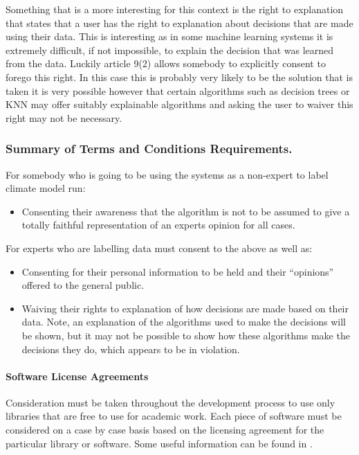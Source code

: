 \documentclass{ecmm427_assignment}
\begin{document}
 Something that is a more interesting for this context is the right
to explanation that states that a user has the right to explanation
about decisions that are made using their data. This is interesting
as in some machine learning systems it is extremely difficult, if
not impossible, to explain the decision that was learned from the
data. Luckily article 9(2) allows somebody to explicitly consent
to forego this right. In this case this is probably very likely to
be the solution that is taken it is very possible however that certain
algorithms such as decision trees or KNN may offer suitably explainable
algorithms and asking the user to waiver this right may not be necessary. 

\subsubsection{Summary of Terms and Conditions Requirements.}

For somebody who is going to be using the systems as a non-expert
to label climate model run:
\begin{itemize}
\item Consenting their awareness that the algorithm is not to be assumed
to give a totally faithful representation of an experts opinion for
all cases.
\end{itemize}
For experts who are labelling data must consent to the above as well
as:
\begin{itemize}
\item Consenting for their personal information to be held and their ``opinions''
offered to the general public.
\item Waiving their rights to explanation of how decisions are made based
on their data. Note, an explanation of the algorithms used to make
the decisions will be shown, but it may not be possible to show how
these algorithms make the decisions they do, which appears to be in
violation.
\end{itemize}

\paragraph{Software License Agreements}

 Consideration must be taken throughout the development process to use
only libraries that are free to use for academic work. Each piece of software must be considered on a case by case basis based on the licensing agreement for
the particular library or software. Some useful information can be found in \cite{ethicalandlegal}.
\end{document}
